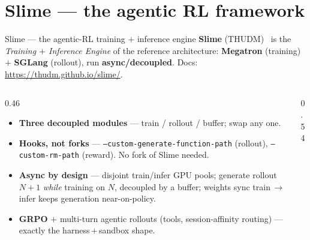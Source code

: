 \documentclass[aspectratio=169]{beamer}
\begin{document}
\section{Slime --- the agentic RL framework}

\begin{frame}{Slime --- the agentic-RL training $+$ inference engine}
  \footnotesize \textbf{Slime} (THUDM)~\cite{slime,slime-docs} is the \emph{Training $+$ Inference Engine}
  of the reference architecture: \textbf{Megatron} (training) $+$ \textbf{SGLang} (rollout), run
  \textbf{async/decoupled}. Docs: \url{https://thudm.github.io/slime/}.
  \vspace{0.2em}
  \begin{columns}[T]
    \begin{column}{0.46\textwidth}
      \begin{itemize}\setlength\itemsep{0.35em}
        \item \textbf{Three decoupled modules} --- train / rollout / buffer; swap any one.
        \item \textbf{Hooks, not forks} --- \texttt{--custom-generate-function-path} (rollout),
          \texttt{--custom-rm-path} (reward). No fork of Slime needed.
        \item \textbf{Async by design} --- disjoint train/infer GPU pools; generate rollout $N{+}1$
          \emph{while} training on $N$, decoupled by a buffer; weights sync train\,$\to$\,infer keeps
          generation near-on-policy.
        \item \textbf{GRPO} $+$ multi-turn agentic rollouts (tools, session-affinity routing) --- exactly
          the harness\,$+$\,sandbox shape.
      \end{itemize}
    \end{column}
    \begin{column}{0.54\textwidth}
      \centering
\end{column}
\end{columns}
\end{frame}
\end{document}
